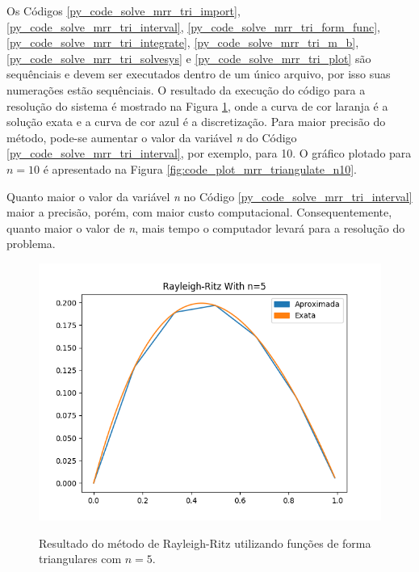 \documentclass[
	12pt,				%
	openright,			%
    twoside,			%
	a4paper,			%
	chapter=TITLE,		%
	english,			%
	french,				%
	spanish,			%
	brazil				%
	]{abntex2}
\numberwithin{lema}{chapter}
\numberwithin{teorema}{chapter}
\numberwithin{definicao}{chapter}
\numberwithin{exemplo}{chapter}
\numberwithin{figure}{chapter}
\begin{document}
Os Códigos \ref{py_code_solve_mrr_tri_import}, \ref{py_code_solve_mrr_tri_interval}, \ref{py_code_solve_mrr_tri_form_func}, \ref{py_code_solve_mrr_tri_integrate}, \ref{py_code_solve_mrr_tri_m_b}, \ref{py_code_solve_mrr_tri_solvesys} e \ref{py_code_solve_mrr_tri_plot} são sequênciais e devem ser executados dentro de um único arquivo, por isso suas numerações estão sequênciais. O resultado da execução do código para a resolução do sistema é mostrado na Figura \ref{fig:code_plot_mrr_triangulate}, onde a curva de cor laranja é a solução exata e a curva de cor azul é a discretização. Para maior precisão do método, pode-se aumentar o valor da variável \textit{n} do Código \ref{py_code_solve_mrr_tri_interval}, por exemplo, para 10. O gráfico plotado para $n=10$ é apresentado na Figura \ref{fig:code_plot_mrr_triangulate_n10}.

Quanto maior o valor da variável \textit{n} no Código \ref{py_code_solve_mrr_tri_interval} maior a precisão, porém, com maior custo computacional. Consequentemente, quanto maior o valor de \textit{n}, mais tempo o computador levará para a resolução do problema.

\begin{figure}[h]
	\caption{Resultado do método de Rayleigh-Ritz utilizando funções de forma triangulares com $n=5$.}
	\centering
	\includegraphics[scale=0.65]{../figuras/code/code_plot_mrr_triangulate.png}
	\label{fig:code_plot_mrr_triangulate}
\end{figure}
\end{document}
